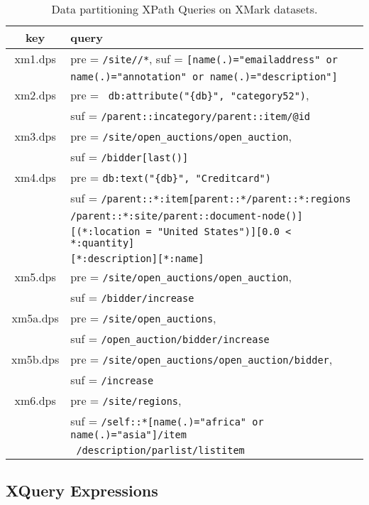  \begin{table}[t]
 	\caption{Data partitioning XPath Queries on XMark datasets. }
 	\label{tab:dpsqueries}
 	\footnotesize
 	\centering
 	\begin{tabular}{c|l}
 		\hline\hline
 		key      &  query\\
 		\hline\hline
 		xm1.dps & pre = \verb|/site//*|, suf = \verb|[name(.)="emailaddress" or| \\
 		        & \verb|name(.)="annotation" or name(.)="description"]| \\
 		\hline
 		xm2.dps & pre = \verb| db:attribute("{db}", "category52")|, \\
        		& suf = \verb|/parent::incategory/parent::item/@id| \\
  		\hline
 		xm3.dps & pre = \verb|/site/open_auctions/open_auction|,\\
 		&  suf = \verb|/bidder[last()]| \\
 		\hline
 		xm4.dps & pre = \verb|db:text("{db}", "Creditcard")| \\
 		& suf =  \verb|/parent::*:item[parent::*/parent::*:regions| \\
 		& \verb|/parent::*:site/parent::document-node()]| \\
 		& \verb|[(*:location = "United States")][0.0 < *:quantity]| \\
 		& \verb|[*:description][*:name]|\\
 		\hline
		xm5.dps & pre  = \verb|/site/open_auctions/open_auction|,\\
		& suf =  \verb|/bidder/increase|\\
		xm5a.dps & pre  = \verb|/site/open_auctions|,\\
		& suf =  \verb|/open_auction/bidder/increase|\\
		xm5b.dps & pre  = \verb|/site/open_auctions/open_auction/bidder|,\\
				& suf =  \verb|/increase|\\
 		\hline
 		xm6.dps & pre  = \verb|/site/regions|,\\
        & suf =  \verb|/self::*[name(.)="africa" or name(.)="asia"]/item|\\
        & \verb| /description/parlist/listitem|\\
 		\hline\hline
 	\end{tabular}
 \end{table}



\subsection{XQuery Expressions}
\label{app:xqueries}

